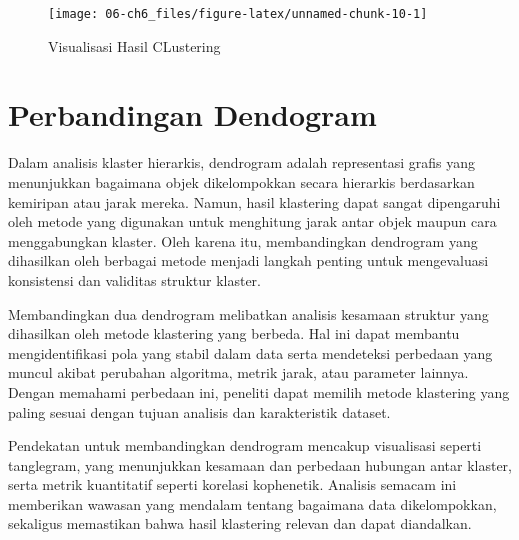 \documentclass[
  oneside]{book}
\begin{document}
\begin{figure}[h]

{\centering \texttt{[image: 06-ch6\_files/figure-latex/unnamed-chunk-10-1]} 

}

\caption{Visualisasi Hasil CLustering}\label{fig:unnamed-chunk-10}
\end{figure}

\section{Perbandingan Dendogram}\label{perbandingan-dendogram}

Dalam analisis klaster hierarkis, dendrogram adalah representasi grafis yang menunjukkan bagaimana objek dikelompokkan secara hierarkis berdasarkan kemiripan atau jarak mereka. Namun, hasil klastering dapat sangat dipengaruhi oleh metode yang digunakan untuk menghitung jarak antar objek maupun cara menggabungkan klaster. Oleh karena itu, membandingkan dendrogram yang dihasilkan oleh berbagai metode menjadi langkah penting untuk mengevaluasi konsistensi dan validitas struktur klaster.

Membandingkan dua dendrogram melibatkan analisis kesamaan struktur yang dihasilkan oleh metode klastering yang berbeda. Hal ini dapat membantu mengidentifikasi pola yang stabil dalam data serta mendeteksi perbedaan yang muncul akibat perubahan algoritma, metrik jarak, atau parameter lainnya. Dengan memahami perbedaan ini, peneliti dapat memilih metode klastering yang paling sesuai dengan tujuan analisis dan karakteristik dataset.

Pendekatan untuk membandingkan dendrogram mencakup visualisasi seperti tanglegram, yang menunjukkan kesamaan dan perbedaan hubungan antar klaster, serta metrik kuantitatif seperti korelasi kophenetik. Analisis semacam ini memberikan wawasan yang mendalam tentang bagaimana data dikelompokkan, sekaligus memastikan bahwa hasil klastering relevan dan dapat diandalkan.
\end{document}
